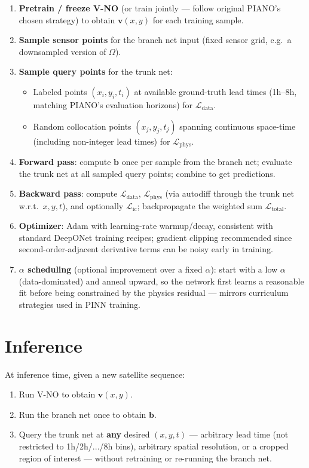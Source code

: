 \documentclass[11pt]{article}
\begin{document}
\begin{enumerate}
    \item \textbf{Pretrain / freeze V-NO} (or train jointly --- follow original PIANO's chosen strategy) to obtain $\mathbf{v}(x,y)$ for each training sample.
    \item \textbf{Sample sensor points} for the branch net input (fixed sensor grid, e.g.\ a downsampled version of $\Omega$).
    \item \textbf{Sample query points} for the trunk net:
    \begin{itemize}
        \item Labeled points $(x_i,y_i,t_i)$ at available ground-truth lead times (1h--8h, matching PIANO's evaluation horizons) for $\mathcal{L}_{\text{data}}$.
        \item Random collocation points $(x_j,y_j,t_j)$ spanning continuous space-time (including non-integer lead times) for $\mathcal{L}_{\text{phys}}$.
    \end{itemize}
    \item \textbf{Forward pass}: compute $\mathbf{b}$ once per sample from the branch net; evaluate the trunk net at all sampled query points; combine to get predictions.
    \item \textbf{Backward pass}: compute $\mathcal{L}_{\text{data}}$, $\mathcal{L}_{\text{phys}}$ (via autodiff through the trunk net w.r.t.\ $x,y,t$), and optionally $\mathcal{L}_{\text{ic}}$; backpropagate the weighted sum $\mathcal{L}_{\text{total}}$.
    \item \textbf{Optimizer}: Adam with learning-rate warmup/decay, consistent with standard DeepONet training recipes; gradient clipping recommended since second-order-adjacent derivative terms can be noisy early in training.
    \item \textbf{$\alpha$ scheduling} (optional improvement over a fixed $\alpha$): start with a low $\alpha$ (data-dominated) and anneal upward, so the network first learns a reasonable fit before being constrained by the physics residual --- mirrors curriculum strategies used in PINN training.
\end{enumerate}

\section{Inference}

At inference time, given a new satellite sequence:

\begin{enumerate}
    \item Run V-NO to obtain $\mathbf{v}(x,y)$.
    \item Run the branch net once to obtain $\mathbf{b}$.
    \item Query the trunk net at \textbf{any} desired $(x,y,t)$ --- arbitrary lead time (not restricted to 1h/2h/.../8h bins), arbitrary spatial resolution, or a cropped region of interest --- without retraining or re-running the branch net.
\end{enumerate}
\end{document}
